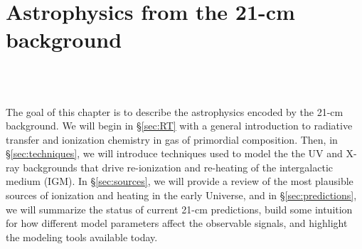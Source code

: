 

\chapter{Astrophysics from the 21-cm background}

\begin{bf}
  \author{Jordan Mirocha}\\
\\
\end{bf}

The goal of this chapter is to describe the astrophysics encoded by the 21-cm background. We will begin in \S\ref{sec:RT} with a general introduction to radiative transfer and ionization chemistry in gas of primordial composition. Then, in \S\ref{sec:techniques}, we will introduce techniques used to model the the UV and X-ray backgrounds that drive re-ionization and re-heating of the intergalactic medium (IGM). In \S\ref{sec:sources}, we will provide a review of the most plausible sources of ionization and heating in the early Universe, and in \S\ref{sec:predictions}, we will summarize the status of current 21-cm predictions, build some intuition for how different model parameters affect the observable signals, and highlight the modeling tools available today.



%
%


